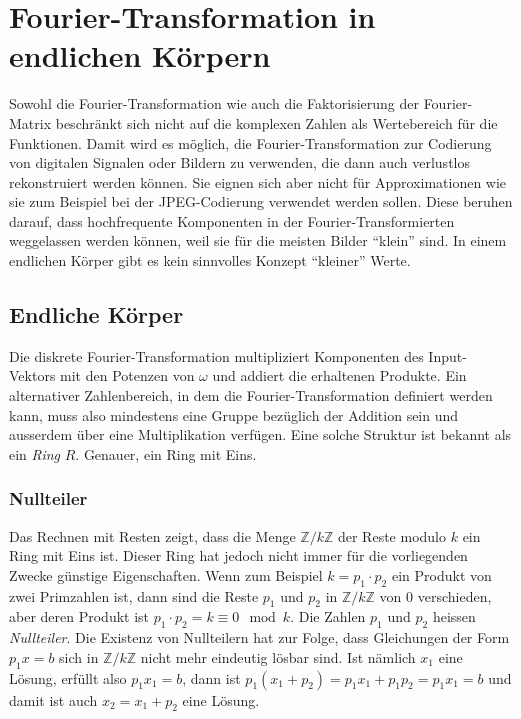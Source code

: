 %
%
%
\section{Fourier-Transformation in endlichen Körpern
\label{buch:diskret:section:koerper}}
Sowohl die Fourier-Transformation wie auch die Faktorisierung
der Fourier-Matrix beschränkt sich nicht auf die komplexen Zahlen
als Wertebereich für die Funktionen.
Damit wird es möglich, die Fourier-Transformation zur Codierung von
digitalen Signalen oder Bildern zu verwenden, die dann auch verlustlos
rekonstruiert werden können.
Sie eignen sich aber nicht für Approximationen wie sie zum Beispiel
bei der JPEG-Codierung verwendet werden sollen.
Diese beruhen darauf, dass hochfrequente Komponenten in der
Fourier-Transformierten weggelassen werden können, weil sie für die
meisten Bilder ``klein'' sind.
In einem endlichen Körper gibt es kein sinnvolles Konzept ``kleiner''
Werte.

%
%
\subsection{Endliche Körper
\label{buch:diskret:koerper:subsection:koerper}}
Die diskrete Fourier-Transformation multipliziert Komponenten des
Input-Vektors mit den Potenzen von $\omega$ und addiert die erhaltenen
Produkte.
Ein alternativer Zahlenbereich, in dem die Fourier-Transformation
definiert werden kann, muss also mindestens eine Gruppe bezüglich 
der Addition sein und ausserdem über eine Multiplikation verfügen.
Eine solche Struktur ist bekannt als ein {\em Ring} $R$.
Genauer, ein Ring mit Eins.

%
%
\subsubsection{Nullteiler}
Das Rechnen mit Resten zeigt, dass die Menge $\mathbb{Z}/k\mathbb{Z}$
der Reste modulo $k$ ein Ring mit Eins ist.
Dieser Ring hat jedoch nicht immer für die vorliegenden Zwecke günstige
Eigenschaften.
Wenn zum Beispiel $k=p_1\cdot p_2$ ein Produkt von zwei Primzahlen
ist, dann sind die Reste $p_1$ und $p_2$ in $\mathbb{Z}/k\mathbb{Z}$
von $0$ verschieden, aber deren Produkt ist
$p_1\cdot p_2 = k \equiv 0 \mod k$.
Die Zahlen $p_1$ und $p_2$ heissen {\em Nullteiler}.
Die Existenz von Nullteilern hat zur Folge, dass Gleichungen der
Form $p_1 x=b$ sich in $\mathbb{Z}/k\mathbb{Z}$ nicht mehr
eindeutig lösbar sind.
Ist nämlich $x_1$ eine Lösung, erfüllt also $p_1x_1=b$, dann ist
$p_1(x_1+p_2)=p_1x_1+p_1p_2=p_1x_1=b$ und damit ist auch $x_2=x_1+p_2$ 
eine Lösung.

